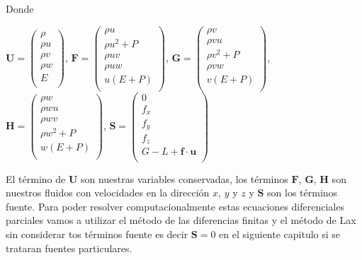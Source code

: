 \documentclass[12pt,a4paper]{book}
\begin{document}
Donde\\
\begin{center}


$\mathbf{U}=
\left(\begin{smallmatrix}
\rho \\
\rho u \\
\rho v \\
\rho w \\
E \\
\end{smallmatrix}\right)
$,
$\mathbf{F} =
\left(\begin{smallmatrix}
\rho u \\
\rho u^{2}+P \\
\rho uv \\
\rho uw \\
u(E+P) \\
\end{smallmatrix}\right)
$,
$\mathbf{G} =
\left(\begin{smallmatrix}
\rho v\\
\rho vu \\
\rho v^{2}+P \\
\rho vw \\
v(E+P) \\
\end{smallmatrix}\right)
$,
$\mathbf{H} =
\left(\begin{smallmatrix}
\rho w\\
\rho wu \\
\rho wv \\
\rho w^{2}+P \\
w(E+P) \\
\end{smallmatrix}\right)
$, 
$\mathbf{S} =
\left(\begin{smallmatrix}
0 \\
f_{x} \\
f_{y} \\
f_{z} \\
G-L+\textbf{f} \cdot \textbf{u} \\
\end{smallmatrix}\right)
$
\end{center}

El término de $\mathbf{U}$ son nuestras variables conservadas, los términos $\mathbf{F}$, $\mathbf{G}$, $\mathbf{H}$ son nuestros fluidos  con velocidades en la dirección $x$, $y$ y $z$ y $\mathbf{S}$ son los términos fuente. Para poder resolver computacionalmente estas ecuaciones diferenciales parciales vamos a utilizar el método de las diferencias finitas y el método de Lax sin considerar tos términos fuente es decir $\mathbf{S}=0$ en el siguiente capitulo si se trataran fuentes particulares.
\end{document}
